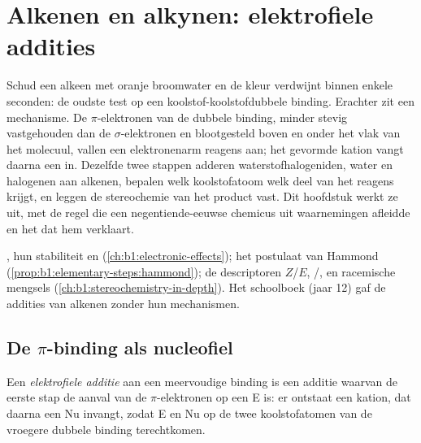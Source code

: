 \chapter{Alkenen en alkynen: elektrofiele addities}\label{ch:b1:electrophilic-additions}

Schud een alkeen met oranje broomwater en de kleur verdwijnt binnen
enkele seconden: de oudste test op een koolstof-koolstofdubbele binding.
Erachter zit een mechanisme. De $\pi$-elektronen van de dubbele binding,
minder stevig vastgehouden dan de $\sigma$-elektronen en blootgesteld
boven en onder het vlak van het molecuul, vallen een elektronenarm
reagens aan; het gevormde kation vangt daarna een  in. Dezelfde
twee stappen adderen waterstofhalogeniden, water en halogenen aan
alkenen, bepalen welk koolstofatoom welk deel van het reagens krijgt, en
leggen de stereochemie van het product vast. Dit hoofdstuk werkt ze uit,
met de regel die een negentiende-eeuwse chemicus uit waarnemingen
afleidde en het  dat hem verklaart.

\begin{recall}
, hun stabiliteit en  (\cref{ch:b1:electronic-effects});
het postulaat van Hammond (\cref{prop:b1:elementary-steps:hammond}); de
descriptoren $Z$/$E$, /,  en racemische
mengsels (\cref{ch:b1:stereochemistry-in-depth}). Het schoolboek (jaar
12) gaf de addities van alkenen zonder hun mechanismen.
\end{recall}

\section{De \texorpdfstring{$\pi$}{pi}-binding als nucleofiel}

\begin{definition}\label{def:b1:electrophilic-additions:electrophilic-addition}
Een \emph{elektrofiele additie} aan een
meervoudige binding is een additie waarvan de eerste stap de aanval van
de $\pi$-elektronen op een  E is: er ontstaat een kation, dat
daarna een  Nu invangt, zodat E en Nu op de twee
koolstofatomen van de vroegere dubbele binding terechtkomen.
\end{definition}

